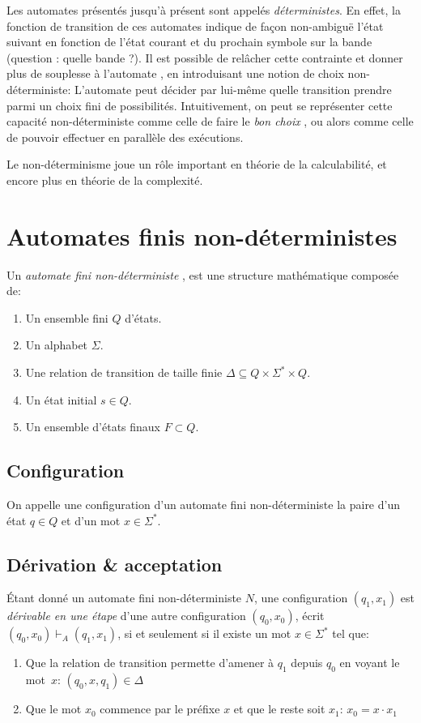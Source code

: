 Les automates présentés jusqu'à présent sont appelés \textit{déterministes}. En effet, la fonction de transition de ces automates indique de façon non-ambiguë l'état suivant en fonction de l'état courant et du prochain symbole sur la bande (question : quelle bande ?).
Il est possible de relâcher cette contrainte et donner plus de souplesse à l'automate , en introduisant une notion de choix non-déterministe: L'automate peut décider par lui-même quelle transition prendre parmi un choix fini de possibilités.
Intuitivement, on peut se représenter cette capacité non-déterministe comme celle de faire le \og \textit{bon choix} \fg, ou alors comme celle de pouvoir effectuer en parallèle des exécutions.

Le non-déterminisme joue un rôle important en théorie de la calculabilité, et encore plus en théorie de la complexité.

\section{Automates finis non-déterministes}

Un \og \textit{automate fini non-déterministe} \fg{}, est une structure mathématique composée de:
\begin{enumerate}
\item Un ensemble fini $Q$ d'états.
\item Un alphabet $\Sigma$.
\item Une relation de transition de taille finie $\Delta \subseteq Q \times \Sigma^* \times Q$.
\item Un état initial $s \in Q$.
\item Un ensemble d'états finaux $F \subset Q$.
\end{enumerate}

\subsection{Configuration}

On appelle une \og configuration \fg{} d'un automate fini non-déterministe la paire d'un état $q \in Q$ et d'un mot $x \in \Sigma^*$.

\subsection{Dérivation \& acceptation}

Étant donné un automate fini non-déterministe $N$, une configuration $(q_1, x_1)$ est \og \textit{dérivable en une étape} \fg{} d'une autre configuration $(q_0, x_0)$, écrit $(q_0, x_0) \vdash_A (q_1, x_1)$, si et seulement si il existe un mot $x \in \Sigma^*$ tel que:
\begin{enumerate}
\item Que la relation de transition permette d'amener à $q_1$ depuis $q_0$ en voyant le mot~$x$: $(q_0, x, q_1) \in \Delta$
\item Que le mot $x_0$ commence par le préfixe $x$ et que le reste soit $x_1$: $x_0 = x \cdot x_1$
\end{enumerate}

